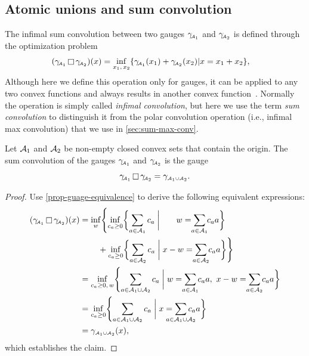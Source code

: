 \subsection{Atomic unions and sum convolution} \label{sec:atomic-unions}

The infimal sum convolution between two gauges $\gamma_{\!\scriptscriptstyle\mathcal{A}_1}$ and
$\gamma_{\!\scriptscriptstyle\mathcal{A}_2}$ is defined through the optimization problem
\begin{align*}
  (\gamma_{\!\scriptscriptstyle\mathcal{A}_1}\mathop\square\gamma_{\!\scriptscriptstyle\mathcal{A}_2})(x)
  &= \inf_{x_1,\,x_2}
  \{\gamma_{\!\scriptscriptstyle\mathcal{A}_1}(x_1)+\gamma_{\!\scriptscriptstyle\mathcal{A}_2}(x_2) | x = x_1 + x_2\},
\end{align*}
Although here we define this operation only for gauges, it can be applied to any
two convex functions and always results in another convex
function~\cite[Theorem~5.4]{rockafellar1970convex}. Normally the operation is
simply called \emph{infimal convolution}, but here we use the term \emph{sum
convolution} to distinguish it from the polar convolution operation (i.e.,
infimal max convolution) that we use in \autoref{sec:sum-max-conv}.

\begin{proposition} \label{prop:sum-convolution}
  Let $\mathcal{A}_1$ and $\mathcal{A}_2$ be non-empty closed convex sets that
  contain the origin. The sum convolution of the gauges
  $\gamma_{\!\scriptscriptstyle\mathcal{A}_1}$ and $\gamma_{\!\scriptscriptstyle\mathcal{A}_2}$ is the gauge
  \[
    \gamma_{\!\scriptscriptstyle\mathcal{A}_1}\mathop\square\gamma_{\!\scriptscriptstyle\mathcal{A}_2} =
    \gamma_{\scriptscriptstyle\mathcal{A}_1\cup\mathcal{A}_2}.
  \]
\end{proposition}

\begin{proof}
  Use \autoref{prop-guage-equivalence} to derive the following equivalent expressions:
  \begin{align*}
    (\gauge\Aso\infc\gauge\Ast)(x)
    &= \inf_w\Biggl\{
      \inf_{c_{a}\ge0}
      \biggl\{
        \sum_{a\in\Ascr_1}c_a \biggm
        |\ \phantom{x-}w=\sum_{\mathclap{a\in\Ascr_1}}c_aa
      \biggr\}
      \\&\phantom{\inf\Biggl\{\,}+
      \inf_{c_{a}\ge0}
      \biggl\{
        \sum_{a\in\Ascr_2}c_a \biggm|
        x-w=\sum_{\mathclap{a\in\Ascr_2}}c_aa
      \biggr\}      
    \Biggr\}
    \\
    &= \inf_{c_a\ge0,\, w}\Biggl\{
      \sum_{a\in\Ascr_1\cup\Ascr_2}c_a \biggm|
      w = \sum_{\mathclap{a\in\Ascr_1}}c_aa,\
      x-w = \sum_{\mathclap{a\in\Ascr_2}}c_aa
      \biggr\}
  \\&= \inf_{c_a\ge0}\Biggl\{
      \sum_{a\in\Ascr_1\cup\Ascr_2}c_a \biggm|
      x = \sum_{\mathclap{a\in\Ascr_1\cup\Ascr_2}}c_aa
    \biggr\}
  \\&= \gauge_{\scriptscriptstyle\Ascr_1\cup\Ascr_2}(x),
  \end{align*}
  which establishes the claim.
\end{proof}

